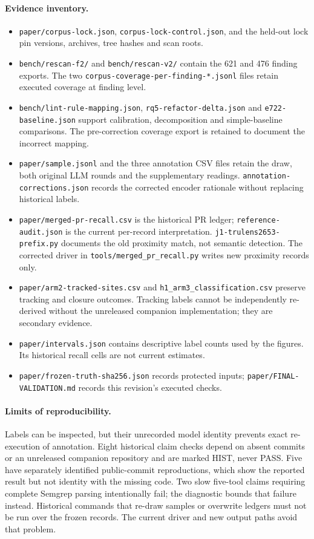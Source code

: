 \documentclass[10pt,a4paper]{article}
\begin{document}
\paragraph{Evidence inventory.}
\begin{itemize}[nosep,leftmargin=*]
\item \texttt{paper/corpus-lock.json}, \texttt{corpus-lock-control.json}, and
  the held-out lock pin versions, archives, tree hashes and scan roots.
\item \texttt{bench/rescan-f2/} and \texttt{bench/rescan-v2/} contain the
  621 and 476 finding exports. The two
  \texttt{corpus-coverage-per-finding-*.jsonl} files retain executed
  coverage at finding level.
\item \texttt{bench/lint-rule-mapping.json}, \texttt{rq5-refactor-delta.json}
  and \texttt{e722-baseline.json} support calibration, decomposition and
  simple-baseline comparisons. The pre-correction coverage export is
  retained to document the incorrect mapping.
\item \texttt{paper/sample.jsonl} and the three annotation CSV files retain
  the draw, both original LLM rounds and the supplementary readings.
  \texttt{annotation-corrections.json} records the corrected encoder
  rationale without replacing historical labels.
\item \texttt{paper/merged-pr-recall.csv} is the historical PR ledger;
  \texttt{reference-audit.json} is the current per-record interpretation.
  \texttt{j1-trulens2653-prefix.py} documents the old proximity match,
  not semantic detection. The corrected driver in
  \texttt{tools/merged\_pr\_recall.py} writes new proximity records only.
\item \texttt{paper/arm2-tracked-sites.csv} and
  \texttt{h1\_arm3\_classification.csv} preserve tracking and closure
  outcomes. Tracking labels cannot be independently re-derived without
  the unreleased companion implementation; they are secondary evidence.
\item \texttt{paper/intervals.json} contains descriptive label counts used
  by the figures. Its historical recall cells are not current estimates.
\item \texttt{paper/frozen-truth-sha256.json} records protected inputs;
  \texttt{paper/FINAL-VALIDATION.md} records this revision's executed checks.
\end{itemize}

\paragraph{Limits of reproducibility.}
Labels can be inspected, but their unrecorded model identity prevents exact
re-execution of annotation. Eight historical claim checks depend on absent
commits or an unreleased companion repository and are marked HIST, never
PASS. Five have separately identified public-commit reproductions, which
show the reported result but not identity with the missing code. Two slow
five-tool claims requiring complete Semgrep parsing intentionally fail;
the diagnostic bounds that failure instead. Historical commands that
re-draw samples or overwrite ledgers must not be run over the frozen
records. The current driver and new output paths avoid that problem.
\end{document}
